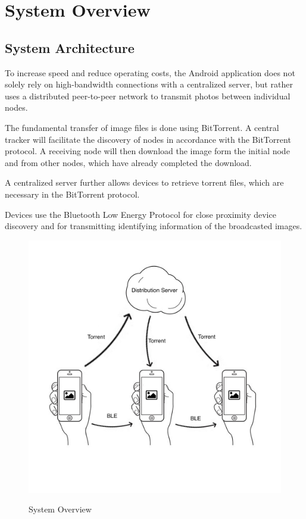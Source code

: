 \documentclass{report}
\newcommand{\lfig}[1]{\label{fig:#1}}
\begin{document}
\section{System Overview}

\subsection{System Architecture}
To increase speed and reduce operating costs, the Android application does not solely rely on high-bandwidth connections with a centralized server, but rather uses a distributed peer-to-peer network to transmit photos between individual nodes.

The fundamental transfer of image files is done using BitTorrent. A central tracker will facilitate the discovery of nodes in accordance with the BitTorrent protocol. A receiving node will then download the image form the initial node and from other nodes, which have already completed the download.

A centralized server further allows devices to retrieve torrent files, which are necessary in the BitTorrent protocol.

Devices use the Bluetooth Low Energy Protocol for close proximity device discovery and for transmitting identifying information of  the broadcasted images.

\begin{figure}[h]
	\centering
    \includegraphics[width=\columnwidth]{overview.jpg}
    \lfig{system-overview}
    \vspace{-5mm} %
	\caption{System Overview}
\end{figure}
\end{document}
